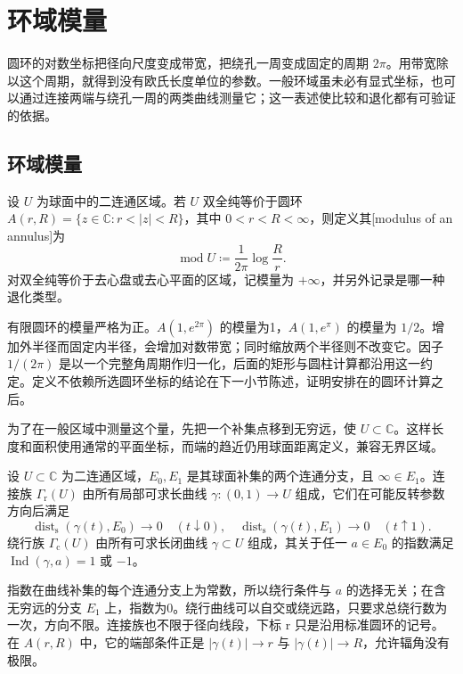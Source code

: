 \section{环域模量}
\label{b3:sec:0802}

圆环的对数坐标把径向尺度变成带宽，把绕孔一周变成固定的周期 \(2\pi\)。用带宽除以这个周期，就得到没有欧氏长度单位的参数。一般环域虽未必有显式坐标，也可以通过连接两端与绕孔一周的两类曲线测量它；这一表述使比较和退化都有可验证的依据。

\subsection{环域模量}
\label{b3:subsec:080201}

\begin{definition}\label{b3:def:08-annulus-modulus}
设 \(U\) 为球面中的二连通区域。若 \(U\) 双全纯等价于圆环 \(A(r,R)=\{z\in\mathbb C:r<|z|<R\}\)，其中 \(0<r<R<\infty\)，则定义其[modulus of an annulus]为
\[
 \operatorname{mod}U\coloneqq\frac1{2\pi}\log\frac Rr.
\]
对双全纯等价于去心盘或去心平面的区域，记模量为 \(+\infty\)，并另外记录是哪一种退化类型。
\end{definition}
有限圆环的模量严格为正。\(A(1,e^{2\pi})\) 的模量为1，\(A(1,e^\pi)\) 的模量为 \(1/2\)。增加外半径而固定内半径，会增加对数带宽；同时缩放两个半径则不改变它。因子 \(1/(2\pi)\) 是以一个完整角周期作归一化，后面的矩形与圆柱计算都沿用这一约定。定义不依赖所选圆环坐标的结论在下一小节陈述，证明安排在的圆环计算之后。

\ProseParagraphBreak
为了在一般区域中测量这个量，先把一个补集点移到无穷远，使 \(U\subset\mathbb C\)。这样长度和面积使用通常的平面坐标，而端的趋近仍用球面距离定义，兼容无界区域。

\begin{definition}\label{b3:def:08-annulus-families}
设 \(U\subset\mathbb C\) 为二连通区域，\(E_0,E_1\) 是其球面补集的两个连通分支，且 \(\infty\in E_1\)。连接族 \(\Gamma_{\mathrm r}(U)\) 由所有局部可求长曲线 \(\gamma:(0,1)\to U\) 组成，它们在可能反转参数方向后满足
\[
 \operatorname{dist}_{\mathrm s}(\gamma(t),E_0)\to0\quad(t\downarrow0),
 \quad
 \operatorname{dist}_{\mathrm s}(\gamma(t),E_1)\to0\quad(t\uparrow1).
\]
绕行族 \(\Gamma_{\mathrm c}(U)\) 由所有可求长闭曲线 \(\gamma\subset U\) 组成，其关于任一 \(a\in E_0\) 的指数满足 \(\operatorname{Ind}(\gamma,a)=1\) 或 \(-1\)。
\end{definition}
指数在曲线补集的每个连通分支上为常数，所以绕行条件与 \(a\) 的选择无关；在含无穷远的分支 \(E_1\) 上，指数为0。绕行曲线可以自交或绕远路，只要求总绕行数为一次，方向不限。连接族也不限于径向线段，下标 \(\mathrm r\) 只是沿用标准圆环的记号。在 \(A(r,R)\) 中，它的端部条件正是 \(|\gamma(t)|\to r\) 与 \(|\gamma(t)|\to R\)，允许辐角没有极限。

